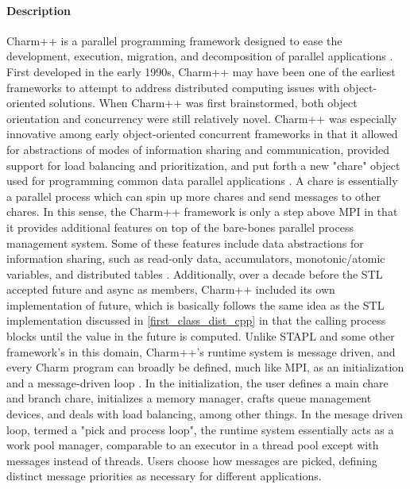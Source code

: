 \paragraph{Description} \label{charm_desc}
Charm++ is a parallel programming framework designed to ease the development, execution, migration, and decomposition of parallel applications \cite{parallel_programming_w_charm}. First developed in the early 1990s, Charm++ may have been one of the earliest frameworks to attempt to address distributed computing issues with object-oriented solutions. When Charm++ was first brainstormed, both object orientation and concurrency were still relatively novel. Charm++ was especially innovative among early object-oriented concurrent frameworks in that it allowed for abstractions of modes of information sharing and communication, provided support for load balancing and prioritization, and put forth a new "chare" object used for programming common data parallel applications \cite{charm_93}. A chare is essentially a parallel process which can spin up more chares and send messages to other chares. In this sense, the Charm++ framework is only a step above MPI in that it provides additional features on top of the bare-bones parallel process management system. Some of these features include data abstractions for information sharing, such as read-only data, accumulators, monotonic/atomic variables, and distributed tables \cite{charm_93}. Additionally, over a decade before the STL accepted future and async as members, Charm++ included its own implementation of future, which is basically follows the same idea as the STL implementation discussed in \ref{first_class_dist_cpp} in that the calling process blocks until the value in the future is computed. Unlike STAPL and some other framework's in this domain, Charm++'s runtime system is message driven, and every Charm program can broadly be defined, much like MPI, as an initialization and a message-driven loop \cite{charm_rts}. In the initialization, the user defines a main chare and branch chare, initializes a memory manager, crafts queue management devices, and deals with load balancing, among other things. In the mesage driven loop, termed a "pick and process loop", the runtime system essentially acts as a work pool manager, comparable to an executor in a thread pool except with messages instead of threads. Users choose how messages are picked, defining distinct message priorities as necessary for different applications.  
